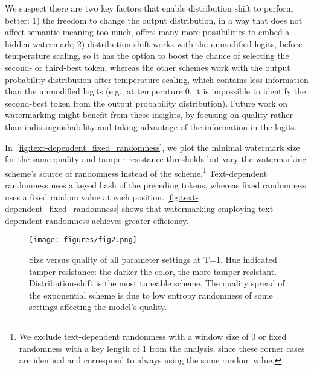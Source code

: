 We suspect there are two key factors that enable distribution shift to perform better: 1) the freedom to change the 
output distribution, in a way that does not affect semantic meaning too much, offers many more possibilities to 
embed a hidden watermark; 2) distribution shift works with the unmodified logits, before temperature scaling, 
so it has the option to boost the chance of selecting the second- or third-best token, whereas the other schemes 
work with the output probability distribution after temperature scaling, which contains less information than 
the unmodified logits (e.g., at temperature 0, it is impossible to identify the second-best token from the 
output probability distribution).
Future work on watermarking might benefit from these insights, by focusing on quality rather than 
indistinguishability and taking advantage of the information in the logits.



\smallskip{}
%
In~\cref{fig:text-dependent_fixed_randomness}, we plot the minimal watermark size for the same quality and 
tamper-resistance thresholds but vary the watermarking scheme's source of randomness instead of the 
scheme.\footnote{We exclude text-dependent randomness with a window size of 0 or fixed randomness with 
a key length of 1 from the analysis, since these corner cases are identical and correspond to always using 
the same random value.} Text-dependent randomness uses a keyed hash of the preceding tokens, whereas fixed 
randomness uses a fixed random value at each position.
\cref{fig:text-dependent_fixed_randomness} shows that watermarking employing text-dependent randomness 
achieves greater efficiency.

\begin{figure}[th]
    \centering
    \texttt{[image: figures/fig2.png]}
    \caption{Size versus quality of all parameter settings at T=1. Hue indicated tamper-resistance: the darker the color, the more tamper-resistant. Distribution-shift is the most tuneable scheme. The quality spread of the exponential scheme is due to low entropy randomness of some settings affecting the model's quality.}
    \label{fig:all_params}
\end{figure}

